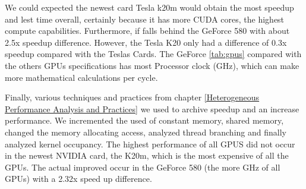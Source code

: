 We could expected the newest card Tesla k20m would obtain the most speedup and lest time overall,  certainly because it has more CUDA cores, the highest compute capabilities. Furthermore, if falls behind the GeForce 580 with about 2.5x speedup difference. However, the Tesla K20 only had a difference of 0.3x speedup compared with the Teslas Cards. The GeForce \ref{tab:gpus} compared with the others GPUs specifications has most Processor clock (GHz), which can make more mathematical calculations per cycle.

  \vspace{3.5em}

Finally, various techniques and practices from chapter \ref{Heterogeneous Performance Analysis and Practices} we used to archive speedup and an increase performance. We incremented the used of constant memory, shared memory, changed the memory allocating access, analyzed thread branching and finally analyzed kernel occupancy. The highest performance of all GPUS did not occur in the newest NVIDIA card, the K20m, which is the most expensive of all the GPUs. The actual improved occur in the GeForce 580 (the more GHz of all GPUs) with a 2.32x speed up difference.
  
